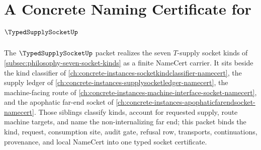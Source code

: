 \chapter{A Concrete Naming Certificate for $\TypedSupplySocketUp$}
\label{ch:concrete-instances-typedsupplysocket-namecert}

The $\TypedSupplySocketUp$ packet realizes the seven $T$-supply socket kinds of \autoref{subsec:philosophy-seven-socket-kinds} as a finite NameCert carrier. It sits beside the kind classifier of \autoref{ch:concrete-instances-socketkindclassifier-namecert}, the supply ledger of \autoref{ch:concrete-instances-supplysocketledger-namecert}, the machine-facing route of \autoref{ch:concrete-instances-machine-interface-socket-namecert}, and the apophatic far-end socket of \autoref{ch:concrete-instances-apophaticfarendsocket-namecert}. Those siblings classify kinds, account for requested supply, route machine targets, and name the non-internalizing far end; this packet binds the kind, request, consumption site, audit gate, refusal row, transports, continuations, provenance, and local NameCert into one typed socket certificate.

